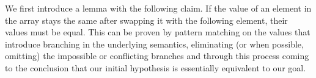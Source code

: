 We first introduce a lemma with the following claim. If the value of an element in the array stays the same after swapping it with the following element, their values must be equal.
This can be proven by pattern matching on the values that introduce branching in the underlying semantics, eliminating (or when possible, omitting) the impossible or conflicting branches and through this process coming to the conclusion that our initial hypothesis is essentially equivalent to our goal.

\begin{code}
    \>[0]\AgdaSpace{}%
    \AgdaSymbol{:}\AgdaSpace{}%
    \AgdaSymbol{\{}\AgdaSpace{}%
    \AgdaSymbol{:}\AgdaSpace{}%
    \AgdaSymbol{\}}\AgdaSpace{}%
    \<%
    \\
    \>[0][@{}l@{\AgdaIndent{0}}]%
    \>[2]\AgdaSpace{}%
    \AgdaSymbol{(}\AgdaSpace{}%
    \AgdaSymbol{)}\AgdaSpace{}%
    \AgdaSpace{}%
    \AgdaSpace{}%
    \AgdaSpace{}%
    \AgdaSymbol{(}\AgdaSpace{}%
    \AgdaSpace{}%
    \AgdaSpace{}%
    \AgdaSpace{}%
    \AgdaSpace{}%
    \AgdaSymbol{)}\AgdaSpace{}%
    \AgdaSpace{}%
    \<%
    \\
    \>[2]\AgdaSpace{}%
    \AgdaOperator{\AgdaFunction{v[}}\AgdaSpace{}%
    \AgdaSpace{}%
    \AgdaOperator{\AgdaFunction{]}}\AgdaSpace{}%
    \AgdaOperator{\AgdaFunction{g[}}\AgdaSpace{}%
    \AgdaSpace{}%
    \AgdaSpace{}%
    \AgdaOperator{\AgdaFunction{]}}\AgdaSpace{}%
    \AgdaSpace{}%
    \AgdaSpace{}%
    \AgdaSpace{}%
    \AgdaSpace{}%
    \AgdaOperator{\AgdaFunction{v[}}\AgdaSpace{}%
    \AgdaSpace{}%
    \AgdaOperator{\AgdaFunction{]}}\AgdaSpace{}%
    \AgdaOperator{\AgdaFunction{g[}}\AgdaSpace{}%
    \AgdaSpace{}%
    \AgdaSymbol{(}\AgdaSpace{}%
    \AgdaSymbol{)}\AgdaSpace{}%
    \AgdaOperator{\AgdaFunction{]}}\AgdaSpace{}%
    \AgdaSpace{}%
    \<%

\end{code}
